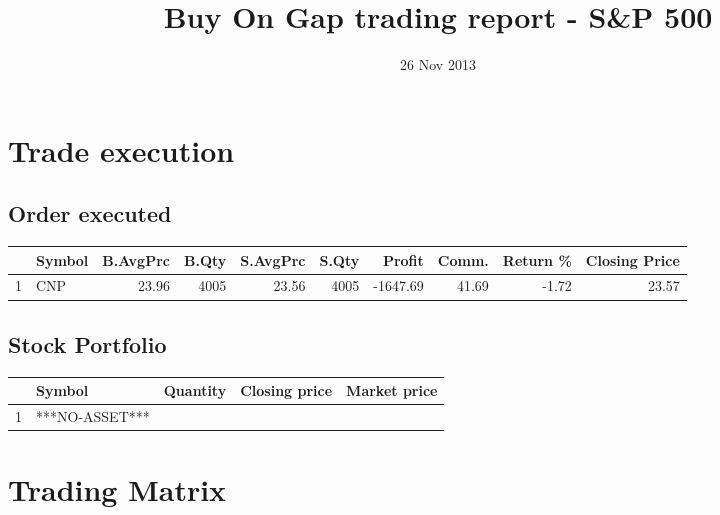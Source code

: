 \documentclass{tufte-handout}\usepackage[]{graphicx}\usepackage[]{color}
\title{Buy On Gap trading report - S\&P 500}
\date{ 26 Nov 2013 }
\begin{document}
\maketitle


\section{Trade execution}
\subsection{Order executed}

\begin{table}[ht]
\centering
\begin{tabular}{llrrrrrrr|r}
  \hline
 & Symbol & B.AvgPrc & B.Qty & S.AvgPrc & S.Qty & Profit & Comm. & Return \% & Closing Price \\ 
  \hline
1 & CNP & 23.96 & 4005 & 23.56 & 4005 & -1647.69 & 41.69 & -1.72 & 23.57 \\ 
   \hline
\end{tabular}
\end{table}



\subsection{Stock Portfolio}
\begin{table}[ht]
\centering
\begin{tabular}{llrrr}
  \hline
 & Symbol & Quantity & Closing price & Market price \\ 
  \hline
1 & ***NO-ASSET*** &  &  &  \\ 
   \hline
\end{tabular}
\end{table}



\section{Trading Matrix}
\end{document}
